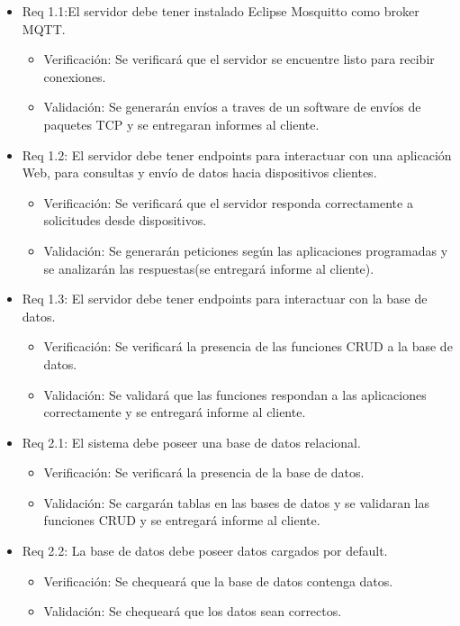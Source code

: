 \documentclass[
11pt, %
]{charter}
\begin{document}
\begin{itemize}

\item Req 1.1:El servidor debe tener instalado Eclipse Mosquitto como broker MQTT.
	\begin{itemize}
	\item Verificación: Se verificará que el servidor se encuentre listo para recibir conexiones.
	\item Validación: Se generarán envíos a traves de un software de envíos de paquetes TCP y se entregaran informes al cliente.
	\end{itemize}


\item Req 1.2: El servidor debe tener endpoints para interactuar con una aplicación Web, para consultas y envío de datos hacia dispositivos clientes.
	\begin{itemize}
	\item Verificación: Se verificará que el servidor responda correctamente a solicitudes desde dispositivos.
	\item Validación: Se generarán peticiones según las aplicaciones programadas y se analizarán las respuestas(se entregará informe al cliente).
	\end{itemize}

\item Req 1.3: El servidor debe tener endpoints para interactuar con la base de datos.
	\begin{itemize}
	\item Verificación: Se verificará la presencia de las funciones CRUD a la base de datos. 
	\item Validación: Se validará que las funciones respondan a las aplicaciones correctamente y se entregará informe al cliente.
	\end{itemize}

\item Req 2.1: El sistema debe poseer una base de datos relacional.
	\begin{itemize}
	\item Verificación: Se verificará la presencia de la base de datos.  
	\item Validación: Se cargarán tablas en las bases de datos y se validaran las funciones CRUD y se entregará informe al cliente.
	\end{itemize}

\item Req 2.2: La base de datos debe poseer datos cargados por default.
	\begin{itemize}
	\item Verificación: Se chequeará que la base de datos contenga datos.
	\item Validación: Se chequeará que los datos sean correctos.
	\end{itemize}


\end{itemize}
\end{document}
